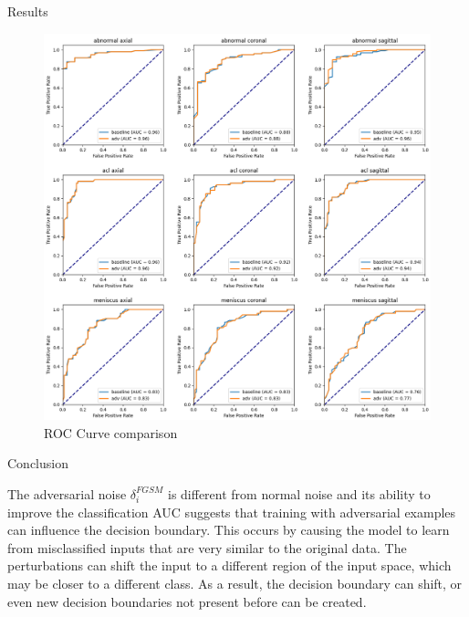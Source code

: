 \documentclass[final]{beamer}
\newlength{\colwidth}
\begin{document}
\begin{frame}[t]
\begin{columns}[t]
\begin{column}{\colwidth}
\begin{block}{Results}
    \begin{figure}[!htp]
    \centering
    \includegraphics[width=1\textwidth]{roc_curve_MRNet_cmp-legend.png}
    \caption{\label{fig:roc}ROC Curve comparison}
    \end{figure}


  \end{block}

  \begin{block}{Conclusion}


    The adversarial noise $\delta_{i}^{FGSM}$ is different from normal noise and its ability to improve the classification AUC suggests that training with adversarial examples can influence the decision boundary. This occurs by causing the model to learn from misclassified inputs that are very similar to the original data. The perturbations can shift the input to a different region of the input space, which may be closer to a different class. As a result, the decision boundary can shift, or even new decision boundaries not present before can be created.


\end{block}
\end{column}
\end{columns}
\end{frame}
\end{document}
